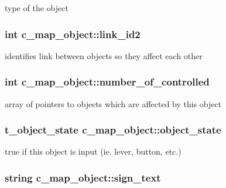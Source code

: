 type of the object \hypertarget{classc__map__object_a95575848075ef4b407907eb8e5c48e3c}{
\subsubsection[{link\-\_\-id2}]{\setlength{\rightskip}{0pt plus 5cm}int c\-\_\-map\-\_\-object\-::link\-\_\-id2\hspace{0.3cm}{\ttfamily [protected]}}}\label{classc__map__object_a95575848075ef4b407907eb8e5c48e3c}
identifies link between objects so they affect each other \hypertarget{classc__map__object_ad03a55702a3f84a90bfa46700ab7124c}{
\subsubsection[{number\-\_\-of\-\_\-controlled}]{\setlength{\rightskip}{0pt plus 5cm}int c\-\_\-map\-\_\-object\-::number\-\_\-of\-\_\-controlled\hspace{0.3cm}{\ttfamily [protected]}}}\label{classc__map__object_ad03a55702a3f84a90bfa46700ab7124c}
array of pointers to objects which are affected by this object \hypertarget{classc__map__object_a8bde4cfd4fed11a9f01389977504a10a}{
\subsubsection[{object\-\_\-state}]{\setlength{\rightskip}{0pt plus 5cm}t\-\_\-object\-\_\-state c\-\_\-map\-\_\-object\-::object\-\_\-state\hspace{0.3cm}{\ttfamily [protected]}}}\label{classc__map__object_a8bde4cfd4fed11a9f01389977504a10a}
true if this object is input (ie. lever, button, etc.) \hypertarget{classc__map__object_a57a973ea5b89a30e3b9f9b1332197493}{
\subsubsection[{sign\-\_\-text}]{\setlength{\rightskip}{0pt plus 5cm}string c\-\_\-map\-\_\-object\-::sign\-\_\-text\hspace{0.3cm}{\ttfamily [protected]}}}\label{classc__map__object_a57a973ea5b89a30e3b9f9b1332197493}
